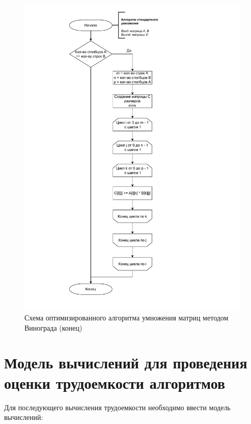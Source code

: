 \begin{figure}[h]
	\centering
	\includegraphics[height=0.9\textheight, page=5]{img/algorithms.pdf}
	\caption{Схема оптимизированного алгоритма умножения матриц методом Винограда (конец)}
	\label{fig:VinogradOpt2}
\end{figure}

\clearpage

\section{Модель вычислений для проведения оценки трудоемкости алгоритмов}
Для последующего вычисления трудоемкости необходимо ввести модель вычислений:

